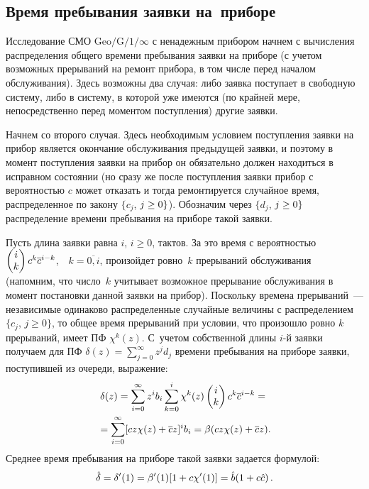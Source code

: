 \begin{multicols}{2}

\section{Время пребывания заявки на~приборе}

Исследование СМО $\mbox{Geo}/\mbox{G}/1/\infty$ с ненадежным
прибором начнем с вычисления распределения общего времени
пребывания заявки на приборе (с учетом возможных
прерываний на ремонт прибора, в том числе перед
началом обслуживания).
Здесь возможны два случая:
либо заявка поступает в свободную систему,
либо в систему, в которой уже имеются (по крайней мере,
непосредственно перед моментом поступления) другие заявки.

Начнем со второго случая.
Здесь необходимым условием поступления заявки
на прибор является окончание обслуживания предыдущей
заявки, и поэтому в момент поступления заявки на прибор
он обязательно должен находиться в исправном состоянии
(но сразу же после поступления заявки прибор
с вероятностью $c$ может отказать и тогда ремонтируется
случайное время, распределенное по закону
$\{c_j$, $j\hm\ge 0\}$).
Обозначим через $\{d_j$, $j\hm\ge 0\}$ распределение
времени пребывания на приборе такой заявки.

Пусть длина заявки равна $i$, $i\ge 0$, тактов.
За это время с вероятностью $\begin{pmatrix}i\\ k\end{pmatrix} c^k \overline c^{i-k}$,\ \
$k=\overline{0,i}$, произойдет
ровно~$k$ прерываний обслуживания (на\-пом\-ним, что число~$k$
учитывает возможное прерывание обслуживания в момент постановки
данной заявки на прибор).
Поскольку времена прерываний~--- независимые одинаково
распределенные случайные величины с распределением
$\{c_j$, $j\ge 0\}$, то общее время прерываний при условии,
что произошло ровно $k$ прерываний, имеет ПФ $\chi^{k}(z)$.
С~учетом собственной длины $i$-й заявки получаем для ПФ
$\delta (z)=\sum\limits_{j=0}^{\infty} z^j d_j$
времени пребывания на приборе заявки, поступившей из очереди,
выражение:
\begin{multline*}
\delta (z)
= \sum_{i=0}^{\infty} z^i b_i \sum_{k=0}^{i}
\chi^k(z) \begin{pmatrix}i\\ k\end{pmatrix} c^k \overline c^{i-k}
= {}\\
{}=\sum_{i=0}^{\infty} [c z \chi(z) + \overline c z]^i b_i
= \beta (c z \chi(z) + \overline c z).
\end{multline*}
Среднее время пребывания на приборе такой заявки задается
формулой:
\begin{equation*}
\label{hd}
\hat\delta = \delta'(1) = \beta'(1) [1 + c \chi'(1)] = \hat b (1 + c \hat c)\,.
\end{equation*}


\end{multicols}
